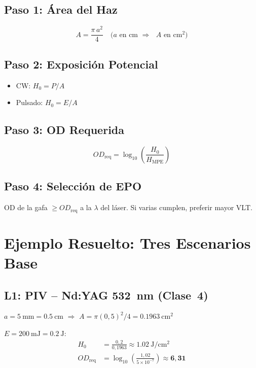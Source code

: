 \documentclass[12pt,a4paper]{article}
\begin{document}
\subsection{Paso 1: Área del Haz}
\begin{equation}
	A = \frac{\pi\, a^2}{4} \quad\text{($a$ en cm $\Rightarrow$ $A$ en cm$^2$)}
	\label{eq:area}
\end{equation}

\subsection{Paso 2: Exposición Potencial}
\begin{itemize}
	\item CW: $H_0 = P/A$ \;[\si{\watt\per\centi\metre\squared}]
	\item Pulsado: $H_0 = E/A$ \;[\si{\joule\per\centi\metre\squared}]
\end{itemize}

\subsection{Paso 3: OD Requerida}
\begin{equation}
	OD_{\mathrm{req}} = \log_{10}\!\left(\frac{H_0}{H_{\mathrm{MPE}}}\right)
	\label{eq:OD_req}
\end{equation}

\subsection{Paso 4: Selección de EPO}
OD de la gafa $\ge OD_{\mathrm{req}}$ a la $\lambda$ del láser. Si varias
cumplen, preferir mayor VLT.

\section{Ejemplo Resuelto: Tres Escenarios Base}
\label{sec:calculos}

\subsection{L1: PIV -- Nd:YAG 532~nm (Clase~4)}

$a = \SI{5}{\mm} = \SI{0.5}{\cm}$ $\Rightarrow$
$A = \pi(0{,}5)^2/4 = \SI{0.1963}{\centi\metre\squared}$

$E = \SI{200}{\mJ} = \SI{0.2}{\joule}$:
\begin{align}
	H_0               & = \frac{0{,}2}{0{,}1963} \approx \SI{1.02}{\joule\per\centi\metre\squared}
	\label{eq:H0_L1}                                                                               \\
	OD_{\mathrm{req}} & = \log_{10}\!\left(\frac{1{,}02}{5\times10^{-7}}\right)
	\approx \mathbf{6{,}31}
	\label{eq:OD_L1}
\end{align}
\end{document}
